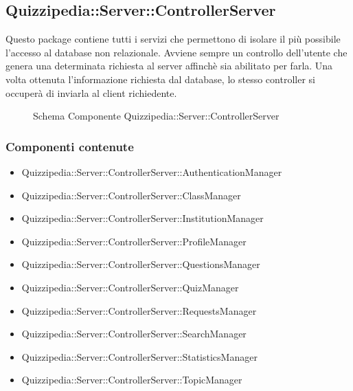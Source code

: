\subsection{Quizzipedia::Server::ControllerServer}
Questo package contiene tutti i servizi che permettono di isolare il più possibile l'accesso al database non relazionale. Avviene sempre un controllo dell'utente che genera una determinata richiesta al server affinchè sia abilitato per farla. 
Una volta ottenuta l'informazione richiesta dal database, lo stesso controller si occuperà di inviarla al client richiedente.
\begin{figure}[H]
\centering
\noindent{}
\caption[Schema Componente Quizzipedia::Server::ControllerServer]{Schema Componente Quizzipedia::Server::ControllerServer}
\end{figure}
\subsubsection{Componenti contenute}
\begin{itemize}
\item Quizzipedia::Server::ControllerServer::AuthenticationManager
\item Quizzipedia::Server::ControllerServer::ClassManager
\item Quizzipedia::Server::ControllerServer::InstitutionManager
\item Quizzipedia::Server::ControllerServer::ProfileManager
\item Quizzipedia::Server::ControllerServer::QuestionsManager
\item Quizzipedia::Server::ControllerServer::QuizManager
\item Quizzipedia::Server::ControllerServer::RequestsManager
\item Quizzipedia::Server::ControllerServer::SearchManager
\item Quizzipedia::Server::ControllerServer::StatisticsManager
\item Quizzipedia::Server::ControllerServer::TopicManager
\end{itemize}
